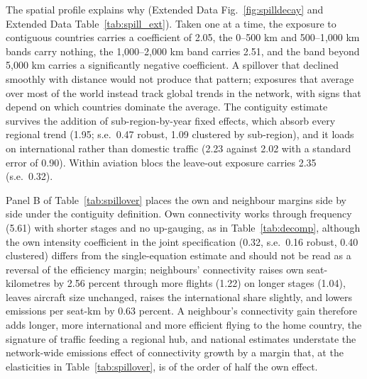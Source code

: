 \documentclass[12pt]{article}
\begin{document}
The spatial profile explains why (Extended Data Fig.~\ref{fig:spilldecay}
and Extended Data Table~\ref{tab:spill_ext}). Taken one at a time, the
exposure to contiguous countries carries a coefficient of 2.05, the 0--500
km and 500--1{,}000 km bands carry nothing, the 1{,}000--2{,}000 km band
carries 2.51, and the band beyond 5{,}000 km carries a significantly
negative coefficient. A spillover that declined smoothly with distance
would not produce that pattern; exposures that average over most of the
world instead track global trends in the network, with signs that depend
on which countries dominate the average. The contiguity estimate survives
the addition of sub-region-by-year fixed effects, which absorb every
regional trend (1.95; s.e.\ 0.47 robust, 1.09 clustered by sub-region),
and it loads on international rather than domestic traffic (2.23 against
2.02 with a standard error of 0.90). Within aviation blocs the leave-out
exposure carries 2.35 (s.e.\ 0.32).

Panel B of Table~\ref{tab:spillover} places the own and neighbour margins
side by side under the contiguity definition. Own connectivity works
through frequency (5.61) with shorter stages and no up-gauging, as in
Table~\ref{tab:decomp}, although the own intensity coefficient in the
joint specification (0.32, s.e.\ 0.16 robust, 0.40 clustered) differs from
the single-equation estimate and should not be read as a reversal of the
efficiency margin; neighbours' connectivity raises own seat-kilometres by 2.56 percent
through more flights (1.22) on longer stages (1.04), leaves aircraft size
unchanged, raises the international share slightly, and lowers emissions
per seat-km by 0.63 percent. A neighbour's connectivity gain therefore
adds longer, more international and more efficient flying to the home
country, the signature of traffic feeding a regional hub, and national
estimates understate the network-wide emissions effect of connectivity
growth by a margin that, at the elasticities in Table~\ref{tab:spillover},
is of the order of half the own effect.

\end{document}
